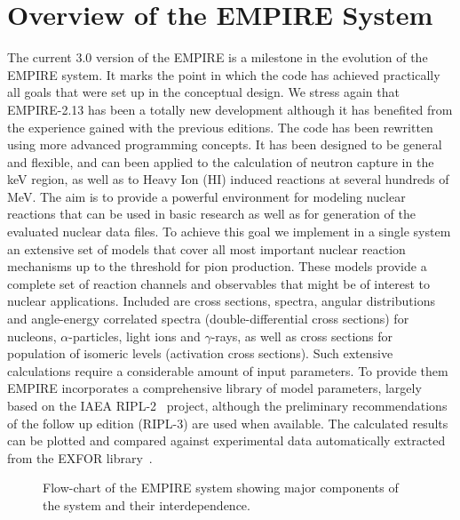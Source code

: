 \documentclass[twocolumn,amsmath,amssymb,10pt,groupedaddress,letter]{revtex4}
\begin{document}
\section{Overview of the EMPIRE System}
The current 3.0 version of the EMPIRE is a milestone in the evolution of the EMPIRE system. It marks the point in which the code has achieved practically all goals that were set up in the conceptual design. We stress again that EMPIRE-2.13 has been a totally new development although it has benefited from the experience
gained with the previous editions. The code
has been rewritten using more advanced programming concepts.
It has been designed to be general and flexible, and can been applied
to the calculation of neutron capture in the keV region, as well as
to Heavy Ion (HI) induced reactions at several hundreds of MeV. The aim is to
provide a powerful environment for modeling nuclear reactions that can be used
in basic research as well as for generation of the evaluated nuclear data files.
To achieve this goal we implement in a single system an extensive set of
models that cover all most important nuclear reaction mechanisms up to the
threshold for pion production. These models provide a complete set of reaction channels and
observables that might be of interest to nuclear applications. Included are
cross sections, spectra, angular distributions and angle-energy correlated spectra
(double-differential cross sections) for nucleons, $\alpha$-particles, light ions
and $\gamma$-rays, as well as cross sections for population of isomeric levels
(activation cross sections). Such extensive calculations require a considerable amount
of input parameters. To provide them EMPIRE incorporates a comprehensive library of model
parameters, largely based on the IAEA RIPL-2~\cite{RIPL2} project,
although the preliminary recommendations of the follow up edition (RIPL-3) are used when available. The calculated results can be plotted and compared against experimental data automatically extracted
from the EXFOR library~\cite{EXFOR}.

\begin{figure*}[htbp]
\caption{Flow-chart of the EMPIRE system showing major components of the system and their interdependence.}
\label{fig:empire-flowchart}
\end{figure*}
\end{document}

